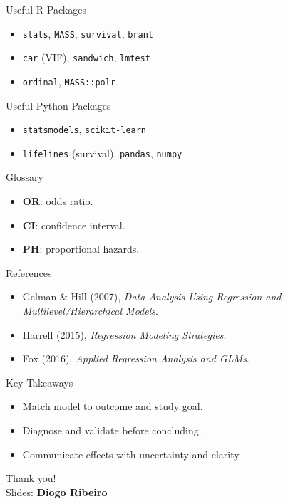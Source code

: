 \documentclass[aspectratio=169]{beamer}
\begin{document}
\begin{frame}{Useful R Packages}
\begin{itemize}
  \item \texttt{stats}, \texttt{MASS}, \texttt{survival}, \texttt{brant}
  \item \texttt{car} (VIF), \texttt{sandwich}, \texttt{lmtest}
  \item \texttt{ordinal}, \texttt{MASS::polr}
\end{itemize}
\end{frame}

\begin{frame}{Useful Python Packages}
\begin{itemize}
  \item \texttt{statsmodels}, \texttt{scikit-learn}
  \item \texttt{lifelines} (survival), \texttt{pandas}, \texttt{numpy}
\end{itemize}
\end{frame}

\begin{frame}{Glossary}
\begin{itemize}
  \item \textbf{OR}: odds ratio.
  \item \textbf{CI}: confidence interval.
  \item \textbf{PH}: proportional hazards.
\end{itemize}
\end{frame}

\begin{frame}{References}
\begin{itemize}
  \item Gelman \& Hill (2007), \emph{Data Analysis Using Regression and Multilevel/Hierarchical Models}.
  \item Harrell (2015), \emph{Regression Modeling Strategies}.
  \item Fox (2016), \emph{Applied Regression Analysis and GLMs}.
\end{itemize}
\end{frame}

\begin{frame}{Key Takeaways}
\begin{itemize}
  \item Match model to outcome and study goal.
  \item Diagnose and validate before concluding.
  \item Communicate effects with uncertainty and clarity.
\end{itemize}
\end{frame}

\begin{frame}
  \centering \Large Thank you! \\\vspace{6pt}
  \normalsize Slides: \textbf{Diogo Ribeiro}
\end{frame}
\end{document}
